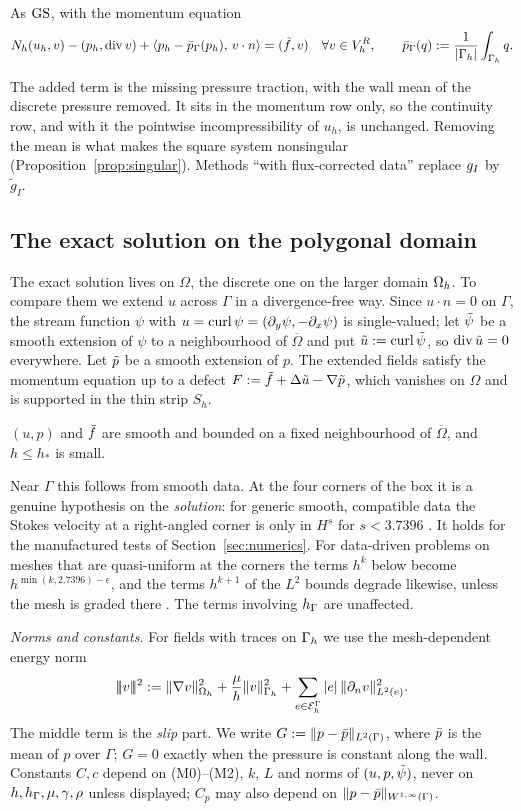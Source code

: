 \begin{definition}\label{def:cns}
As $\mathrm{GS}$, with the momentum equation
\[
N_h(u_h,v)-(p_h,\operatorname{div} v)+\langle p_h-\bar p_{\Gamma}(p_h),\, v\cdot n\rangle=(\tilde f,v)\quad\forall v\in V_h^R,\qquad \bar p_{\Gamma}(q):=\frac1{|\Gamma_h|}\int_{\Gamma_h}q .
\]
\end{definition}
The added term is the missing pressure traction, with the wall mean of the discrete pressure removed. It sits in the momentum row only, so the continuity row, and with it the pointwise incompressibility of $u_h$, is unchanged. Removing the mean is what makes the square system nonsingular (Proposition~\ref{prop:singular}). Methods ``with flux-corrected data'' replace $g_I$ by $\tilde g_I$.

\subsection{The exact solution on the polygonal domain}
The exact solution lives on $\Omega$, the discrete one on the larger domain $\Omega_h$. To compare them we extend $u$ across $\Gamma$ in a divergence-free way. Since $u\cdot n=0$ on $\Gamma$, the stream function $\psi$ with $u=\operatorname{curl}\psi=(\partial_y\psi,-\partial_x\psi)$ is single-valued; let $\tilde\psi$ be a smooth extension of $\psi$ to a neighbourhood of $\overline\Omega$ and put $\tilde u:=\operatorname{curl}\tilde\psi$, so $\operatorname{div}\tilde u=0$ everywhere. Let $\tilde p$ be a smooth extension of $p$. The extended fields satisfy the momentum equation up to a defect $F:=\tilde f+\Delta\tilde u-\nabla\tilde p$, which vanishes on $\Omega$ and is supported in the thin strip $S_h$.

\begin{assumption}\label{ass:D}
$(u,p)$ and $\tilde f$ are smooth and bounded on a fixed neighbourhood of $\overline\Omega$, and $h\le h_\ast$ is small.
\end{assumption}
Near $\Gamma$ this follows from smooth data. At the four corners of the box it is a genuine hypothesis on the \emph{solution}: for generic smooth, compatible data the Stokes velocity at a right-angled corner is only in $H^s$ for $s<3.7396$ \cite{Dauge1989}. It holds for the manufactured tests of Section~\ref{sec:numerics}. For data-driven problems on meshes that are quasi-uniform at the corners the terms $h^k$ below become $h^{\min(k,2.7396)-\epsilon}$, and the terms $h^{k+1}$ of the $L^2$ bounds degrade likewise, unless the mesh is graded there \cite{PadhiExt}. The terms involving $h_\Gamma$ are unaffected.

\emph{Norms and constants.} For fields with traces on $\Gamma_h$ we use the mesh-dependent energy norm
\[
|\!|\!|v|\!|\!|^2:=\lVert \nabla v\rVert_{\Omega_h}^2+\frac{\mu}{h}\lVert v\rVert_{\Gamma_h}^2+\sum_{e\in\mathcal E_h^\Gamma}|e|\,\lVert \partial_n v\rVert_{L^2(e)}^2 .
\]
The middle term is the \emph{slip} part. We write $G:=\lVert p-\bar p\rVert_{L^2(\Gamma)}$, where $\bar p$ is the mean of $p$ over $\Gamma$; $G=0$ exactly when the pressure is constant along the wall. Constants $C,c$ depend on (M0)--(M2), $k$, $L$ and norms of $(u,p,\tilde\psi)$, never on $h,h_\Gamma,\mu,\gamma,\rho$ unless displayed; $C_p$ may also depend on $\lVert p-\bar p\rVert_{W^{1,\infty}(\Gamma)}$.

